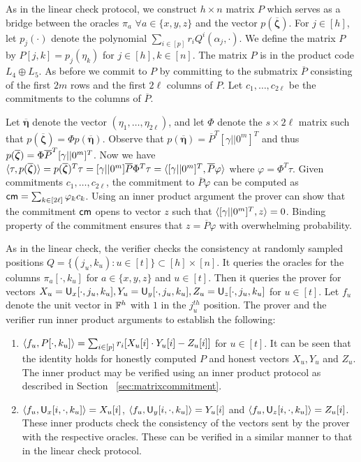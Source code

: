  As in the linear check protocol, we
construct $h\times n$ matrix $P$ which serves as a bridge between the oracles
$\pi_a$ $\forall a \in \{x,y,z\}$ and the vector $p(\overline{\bm{\zeta}})$.
For $j\in [h]$, let $p_j(\cdot)$ denote the polynomial $\sum_{i\in[p]}
r_iQ^i(\alpha_j, \cdot)$. We define the matrix $P$ by $P[j,k]= p_j(\eta_k)$ for
$j\in[h], k\in[n]$. The matrix $P$ is in the product code $L_4\oplus L_5$. As
before we commit to $P$ by committing to the submatrix $\overline{P}$
consisting of the first $2m$ rows and the first $2\ell$ columns of $P$. Let
$c_1,\ldots,c_{2\ell}$ be the commitments to the columns of $\overline{P}$.\smallskip

 Let
$\overline{\bm{\eta}}$ denote the vector $(\eta_1, \ldots, \eta_{2\ell})$, and
let $\Phi$ denote the $s\times 2\ell$ matrix such that
$p(\overline{\bm{\zeta}}) = \Phi p(\overline{\bm{\eta}})$. Observe
that $p(\overline{\bm{\eta}}) = \overline{P}^T [\gamma||0^m]^T$ and thus
$p(\overline{\bm{\zeta}}) = \Phi \overline{P}^T [\gamma||0^m]^T$. Now we have
$\langle \tau,p(\overline{\bm{\zeta}})\rangle = p(\overline{\bm{\zeta}})^T \tau = [\gamma||0^m] \overline{P}
\Phi^T \tau = \langle [\gamma||0^m]^T,\overline{P}\varphi\rangle$ where $\varphi =
\Phi^T \tau$. Given commitments $c_1, \ldots, c_{2\ell}$, the commitment to
$\overline{P}\varphi$ can be computed as $\mathsf{cm} = \sum_{k\in[2\ell]} \varphi_k
c_k$. Using an inner product argument the prover can show that the commitment
$\mathsf{cm}$ opens to vector $z$ such that $\langle [\gamma||0^m]^T,z\rangle = 0$. Binding
property of the commitment ensures that $z = \overline{P}\varphi$ with
overwhelming probability.

As in the linear check, the verifier checks
the consistency at randomly sampled positions $Q=\{(j_u,k_u) : u\in[t] \}
\subset [h]\times[n]$. It queries the oracles for the columns
$\pi_a[\cdot, k_u]$ for $a\in \{x,y,z\}$ and $u\in [t]$. 
Then it queries the prover for vectors $X_u = \mathsf{U}_x[\cdot,j_u,k_u], Y_u =
\mathsf{U}_y[\cdot, j_u,k_u], Z_u = \mathsf{U}_z[\cdot,j_u,k_u]$ for $u\in [t]$. Let
$f_u$ denote the unit vector in $\mathbb{F}^h$ with $1$ in the $j_u^{th}$ position. The
prover and the verifier run inner product arguments to establish the following: 

\begin{enumerate}[{\rm 1.}]
	\item $\langle f_u,P[\cdot,k_u]\rangle = \sum_{i\in[p]} r_i[X_u[i]\cdot Y_u[i]
- Z_u[i]]$ for $u\in[t]$. It can be seen that the identity holds for honestly
computed $P$ and honest vectors $X_u,Y_u$ and $Z_u$. The inner product may be 
verified using an inner product protocol as described in Section ~\ref{sec:matrixcommitment}.
	
	\item $\langle f_u,\mathsf{U}_x[i,\cdot,k_u]\rangle = X_u[i]$, $\langle f_u,\mathsf{U}_y[i,\cdot,k_u]\rangle=Y_u[i]$ and $\langle f_u,\mathsf{U}_z[i,\cdot,k_u]\rangle=Z_u[i]$. These inner products check the consistency of the vectors sent by the prover with the respective oracles. These can be verified in a similar manner to that in the linear check protocol. 
\end{enumerate}

